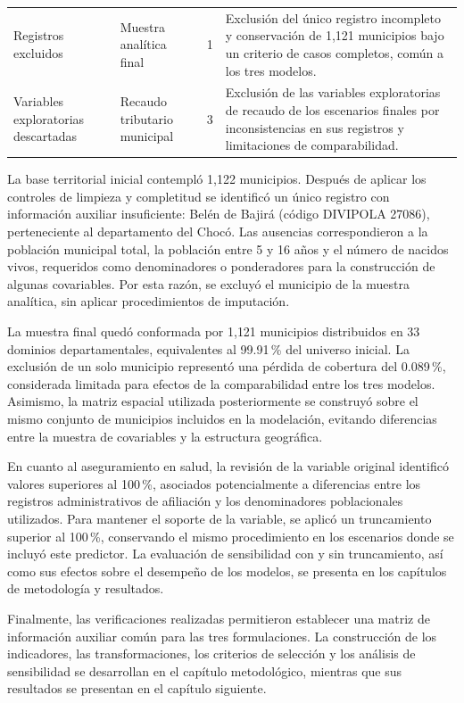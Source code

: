 \begin{table}[!htbp]
{\begin{tabular}{p{3.2cm} p{3.1cm} c p{6.0cm}}
\addlinespace

Registros excluidos &
Muestra analítica final &
1 &
Exclusión del único registro incompleto y conservación de 1{,}121 municipios bajo un criterio de casos completos, común a los tres modelos. \\

\addlinespace

Variables exploratorias descartadas &
Recaudo tributario municipal &
3 &
Exclusión de las variables exploratorias de recaudo de los escenarios finales por inconsistencias en sus registros y limitaciones de comparabilidad. \\

\bottomrule
\end{tabular}%
}
\end{table}


La base territorial inicial contempló 1{,}122 municipios. Después de aplicar los controles de limpieza y completitud se identificó un único registro con información auxiliar insuficiente: Belén de Bajirá (código DIVIPOLA 27086), perteneciente al departamento del Chocó. Las ausencias correspondieron a la población municipal total, la población entre 5 y 16 años y el número de nacidos vivos, requeridos como denominadores o ponderadores para la construcción de algunas covariables. Por esta razón, se excluyó el municipio de la muestra analítica, sin aplicar procedimientos de imputación.

La muestra final quedó conformada por 1{,}121 municipios distribuidos en 33 dominios departamentales, equivalentes al 99.91\,\% del universo inicial. La exclusión de un solo municipio representó una pérdida de cobertura del 0.089\,\%, considerada limitada para efectos de la comparabilidad entre los tres modelos. Asimismo, la matriz espacial utilizada posteriormente se construyó sobre el mismo conjunto de municipios incluidos en la modelación, evitando diferencias entre la muestra de covariables y la estructura geográfica.

En cuanto al aseguramiento en salud, la revisión de la variable original identificó valores superiores al 100\,\%, asociados potencialmente a diferencias entre los registros administrativos de afiliación y los denominadores poblacionales utilizados. Para mantener el soporte de la variable, se aplicó un truncamiento superior al 100\,\%, conservando el mismo procedimiento en los escenarios donde se incluyó este predictor. La evaluación de sensibilidad con y sin truncamiento, así como sus efectos sobre el desempeño de los modelos, se presenta en los capítulos de metodología y resultados.

Finalmente, las verificaciones realizadas permitieron establecer una matriz de información auxiliar común para las tres formulaciones. La construcción de los indicadores, las transformaciones, los criterios de selección y los análisis de sensibilidad se desarrollan en el capítulo metodológico, mientras que sus resultados se presentan en el capítulo siguiente.

